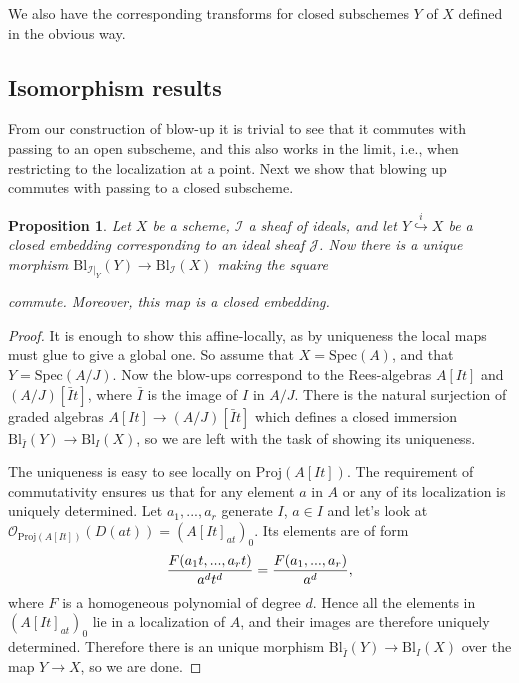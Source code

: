 \documentclass[12pt,a4paper,leqno]{article}
\newcommand{\OO}{\mathcal{O}}
\newcommand{\spec}{\mathrm{Spec}}
\newcommand{\bl}{\mathrm{Bl}}
\newcommand{\proj}{\mathrm{Proj}}
\theoremstyle{plain}
\newtheorem{prop}[theo]{Proposition}
\theoremstyle{definition}
\theoremstyle{remark}
\begin{document}
We also have the corresponding transforms for closed subschemes $Y$ of $X$ defined in the obvious way.

\subsection{Isomorphism results}

From our construction of blow-up it is trivial to see that it commutes with passing to an open subscheme, and this also works in the limit, i.e., when restricting to the localization at a point. Next we show that blowing up commutes with passing to a closed subscheme.

\begin{prop}\label{BlowUpCommutesWithClosedEmbeddings}
Let $X$ be a scheme, $\mathscr{I}$ a sheaf of ideals, and let $Y \stackrel{i}{\hookrightarrow} X$ be a closed embedding corresponding to an ideal sheaf $\mathscr{J}$. Now there is a unique morphism $\bl_{\mathscr{I}|_Y}(Y) \to \bl_{\mathscr{I}}(X)$ making the square
\begin{center}
\end{center}
commute. Moreover, this map is a closed embedding.
\end{prop}
\begin{proof}
It is enough to show this affine-locally, as by uniqueness the local maps must glue to give a global one. So assume that $X = \spec (A)$, and that $Y = \spec (A/J)$. Now the blow-ups correspond to the Rees-algebras $A[It]$ and $(A/J)[\bar{I}t]$, where $\bar I$ is the image of $I$ in $A/J$. There is the natural surjection of graded algebras $A[It] \to (A/J)[\bar{I}t]$ which defines a closed immersion $\bl_{\bar{I}} (Y) \to \bl_I (X)$, so we are left with the task of showing its uniqueness.

The uniqueness is easy to see locally on $\proj (A[It])$. The requirement of commutativity ensures us that for any element $a$ in $A$ or any of its localization is uniquely determined. Let $a_1,...,a_r$ generate $I$, $a \in I$ and let's look at $\OO_{\proj (A[It])} (D(at)) = (A[It]_{at})_0$. Its elements are of form
\begin{equation*}
{F(a_1t,...,a_rt) \over a^dt^d} = {F(a_1,...,a_r) \over a^d},
\end{equation*}
where $F$ is a homogeneous polynomial of degree $d$. Hence all the elements in $(A[It]_{at})_0$ lie in a localization of $A$, and their images are therefore uniquely determined. Therefore there is an unique morphism $\bl_{\bar{I}} (Y) \to \bl_I (X)$ over the map $Y \to X$, so we are done.
\end{proof}
\end{document}
